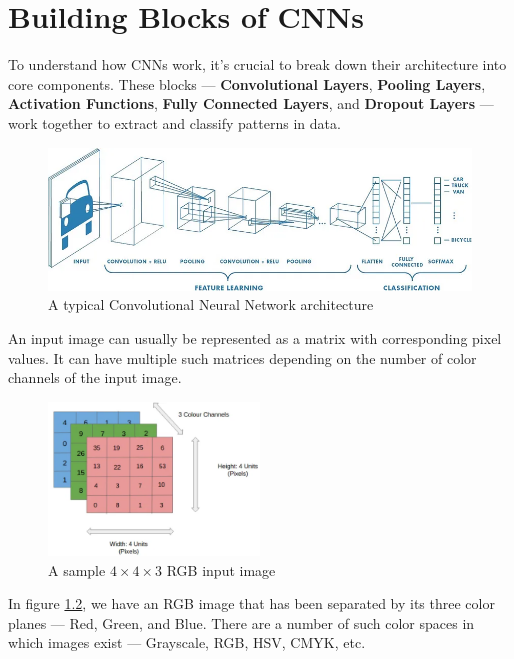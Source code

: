 \chapter{Building Blocks of CNNs}\label{chp:3}
To understand how CNNs work, it’s crucial to break down their architecture into core components. These blocks — \textbf{Convolutional Layers}, \textbf{Pooling Layers}, \textbf{Activation Functions}, \textbf{Fully Connected Layers}, and \textbf{Dropout Layers} — work together to extract and classify patterns in data.\\

\begin{figure}[h!]
    \centering
    \includegraphics[width=\textwidth]{images/figure4.png}
    \caption{A typical Convolutional Neural Network architecture}
    \label{fig:4}
\end{figure}

An input image can usually be represented as a matrix with corresponding pixel values. It can have multiple such matrices depending on the number of color channels of the input image.

\begin{figure}[h!]
    \centering
    \includegraphics[width=0.5\textwidth]{images/figure5.png}
    \caption{A sample $4 \times 4 \times 3$ RGB input image}
    \label{fig:5}
\end{figure}

In figure \ref{fig:5}, we have an RGB image that has been separated by its three color planes — Red, Green, and Blue. There are a number of such color spaces in which images exist — Grayscale, RGB, HSV, CMYK, etc.\\

